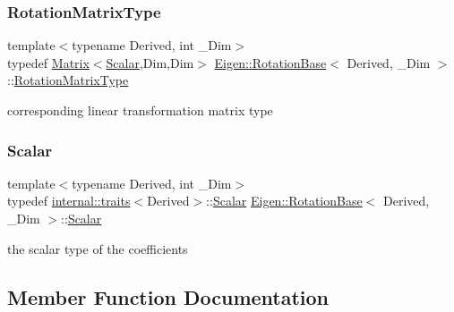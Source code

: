 \subsubsection{\texorpdfstring{RotationMatrixType}{RotationMatrixType}}
{\footnotesize\ttfamily template$<$typename Derived, int \+\_\+\+Dim$>$ \\
typedef \mbox{\hyperlink{class_eigen_1_1_matrix}{Matrix}}$<$\mbox{\hyperlink{class_eigen_1_1_rotation_base_af9b43eac462d7aa70b018efd49c13ef4}{Scalar}},Dim,Dim$>$ \mbox{\hyperlink{class_eigen_1_1_rotation_base}{Eigen\+::\+Rotation\+Base}}$<$ Derived, \+\_\+\+Dim $>$\+::\mbox{\hyperlink{class_eigen_1_1_rotation_base_a83602509674c9d635551998460342951}{Rotation\+Matrix\+Type}}}

corresponding linear transformation matrix type \mbox{\label{class_eigen_1_1_rotation_base_af9b43eac462d7aa70b018efd49c13ef4}} 
\subsubsection{\texorpdfstring{Scalar}{Scalar}}
{\footnotesize\ttfamily template$<$typename Derived, int \+\_\+\+Dim$>$ \\
typedef \mbox{\hyperlink{struct_eigen_1_1internal_1_1traits}{internal\+::traits}}$<$Derived$>$\+::\mbox{\hyperlink{class_eigen_1_1_rotation_base_af9b43eac462d7aa70b018efd49c13ef4}{Scalar}} \mbox{\hyperlink{class_eigen_1_1_rotation_base}{Eigen\+::\+Rotation\+Base}}$<$ Derived, \+\_\+\+Dim $>$\+::\mbox{\hyperlink{class_eigen_1_1_rotation_base_af9b43eac462d7aa70b018efd49c13ef4}{Scalar}}}

the scalar type of the coefficients 

\subsection{Member Function Documentation}
\mbox{\label{class_eigen_1_1_rotation_base_a2835ea92940986b4220cf47538a6bc41}} 
